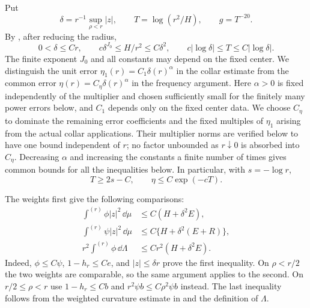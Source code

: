 Put
\[
 \delta=r^{-1}\sup_{\rho<r}|z|,
 \qquad T=\log(r^2/H),\qquad g=T^{-20}.
\]
By , after reducing the radius,
\begin{equation}\label{in:smallness}
 0<\delta\leq Cr,\qquad
 c\delta^{J_0}\leq H/r^2\leq C\delta^2,
 \qquad c|\log\delta|\leq T\leq C|\log\delta|.
\end{equation}
The finite exponent $J_0$ and all constants may depend on the fixed center.
We distinguish the unit error $\eta_1(r)=C_1\delta(r)^\alpha$ in the
collar estimate from the common error $\eta(r)=C_\eta\delta(r)^\alpha$
in the frequency argument.  Here $\alpha>0$ is fixed independently of
the multiplier and chosen sufficiently small for the finitely many power errors below, and $C_1$
depends only on the fixed center data.  We choose $C_\eta$ to dominate
the remaining error coefficients and the fixed multiples of $\eta_1$
arising from the actual collar applications.  Their multiplier norms
are verified below to have one bound independent of $r$; no factor
unbounded as $r\downarrow0$ is absorbed into $C_\eta$.  Decreasing
$\alpha$ and increasing the constants a finite number of times gives
common bounds for all the inequalities below.  In particular,
with $s=-\log r$,
\begin{equation}\label{in:exponentialerror}
 T\geq2s-C,\qquad \eta\leq C\exp(-cT).
\end{equation}

The weights first give the following comparisons:
\begin{equation}\label{in:weightcomparison}
 \begin{split}
 \int^{(r)}\phi |z|^2\,\dd\mu
   &\leq C(H+\delta^2E),\\
 \int^{(r)}\psi |z|^2\,\dd\mu
   &\leq C\{H+\delta^2(E+R)\},\\
 r^2\int^{(r)}\phi\,\dd\Lambda
   &\leq Cr^2(H+\delta^2E).
 \end{split}
\end{equation}
Indeed, $\phi\leq C\psi$, $1-h_r\leq Ce$, and $|z|\leq\delta r$
prove the first inequality.  On $\rho<r/2$ the two weights are comparable,
so the same argument applies to the second.  On $r/2\leq\rho<r$ use
$1-h_r\leq Cb$ and $r^2\psi b\leq C\rho^2\psi b$ instead.
The last inequality follows from the weighted curvature estimate in
 and the definition of $\Lambda$.

